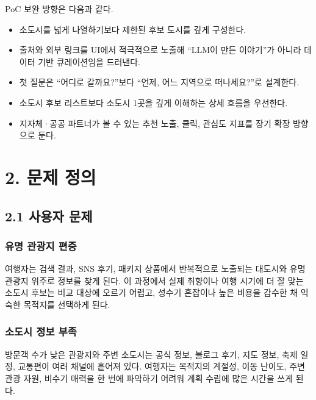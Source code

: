 \documentclass[12pt,a4paper]{article}
\newcommand{\DocNeedspace}[1]{\par\ifdim\dimexpr\pagegoal-\pagetotal\relax<#1\newpage\fi}
\begin{document}
\DocNeedspace{3\baselineskip}
PoC 보완 방향은 다음과 같다.


\begin{itemize}
\item 소도시를 넓게 나열하기보다 제한된 후보 도시를 깊게 구성한다.
\item 출처와 외부 링크를 UI에서 적극적으로 노출해 “LLM이 만든 이야기”가 아니라 데이터 기반 큐레이션임을 드러낸다.
\item 첫 질문은 “어디로 갈까요?”보다 “언제, 어느 지역으로 떠나세요?”로 설계한다.
\item 소도시 후보 리스트보다 소도시 1곳을 깊게 이해하는 상세 흐름을 우선한다.
\item 지자체·공공 파트너가 볼 수 있는 추천 노출, 클릭, 관심도 지표를 장기 확장 방향으로 둔다.
\end{itemize}


\newpage

\DocNeedspace{10\baselineskip}
\section*{2. 문제 정의}


\DocNeedspace{8\baselineskip}
\subsection*{2.1 사용자 문제}


\DocNeedspace{5\baselineskip}
\subsubsection*{유명 관광지 편중}
여행자는 검색 결과, SNS 후기, 패키지 상품에서 반복적으로 노출되는 대도시와 유명 관광지 위주로 정보를 찾게 된다. 이 과정에서 실제 취향이나 여행 시기에 더 잘 맞는 소도시 후보는 비교 대상에 오르기 어렵고, 성수기 혼잡이나 높은 비용을 감수한 채 익숙한 목적지를 선택하게 된다.

\DocNeedspace{5\baselineskip}
\subsubsection*{소도시 정보 부족}
방문객 수가 낮은 관광지와 주변 소도시는 공식 정보, 블로그 후기, 지도 정보, 축제 일정, 교통편이 여러 채널에 흩어져 있다. 여행자는 목적지의 계절성, 이동 난이도, 주변 관광 자원, 비수기 매력을 한 번에 파악하기 어려워 계획 수립에 많은 시간을 쓰게 된다.
\end{document}
